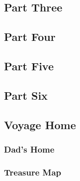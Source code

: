 \subsection{Part Three}


\subsection{Part Four}


\subsection{Part Five}


\subsection{Part Six}


\subsection{Voyage Home}


\subsubsection{Dad's Home}


\subsubsection{Treasure Map}

